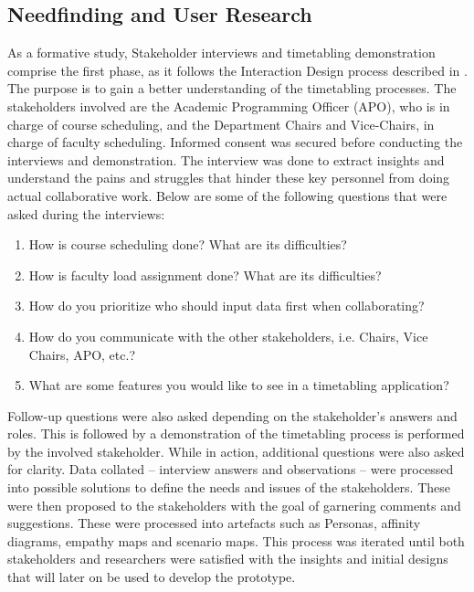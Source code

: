 \subsection{Needfinding and User Research}
As a formative study, Stakeholder interviews and timetabling demonstration comprise the first phase, as it follows the Interaction Design process described in \cite{Dix:2003:HI:1203012}. The purpose is to gain a better understanding of the timetabling processes. The stakeholders involved are the Academic Programming Officer (APO), who is in charge of course scheduling, and the Department Chairs and Vice-Chairs, in charge of faculty scheduling. Informed consent was secured before conducting the interviews and demonstration. The interview was done to extract insights and understand the pains and struggles that hinder these key personnel from doing actual collaborative work. Below are some of the following questions that were asked during the interviews:
\begin{enumerate}
    \item How is course scheduling done? What are its difficulties?
    \item How is faculty load assignment done? What are its difficulties?
    \item How do you prioritize who should input data first when collaborating?
    \item How do you communicate with the other stakeholders, i.e. Chairs, Vice Chairs, APO, etc.?
    \item What are some features you would like to see in a timetabling application?
\end{enumerate}
Follow-up questions were also asked depending on the stakeholder's answers and roles. This is followed by a demonstration of the timetabling process is performed by the involved stakeholder. While in action, additional questions were also asked for clarity. Data collated -- interview answers and observations -- were processed into possible solutions to define the needs and issues of the stakeholders. These were then proposed to the stakeholders with the goal of garnering comments and suggestions. These were processed into artefacts such as Personas, affinity diagrams, empathy maps and scenario maps. This process was iterated until both stakeholders and researchers were satisfied with the insights and initial designs that will later on be used to develop the prototype. 

